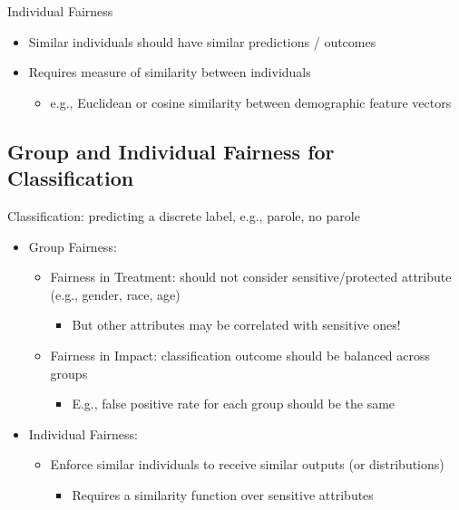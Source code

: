 \documentclass[11pt]{article}
\theoremstyle{definition}
\begin{document}
Individual Fairness
\begin{itemize}
    \item Similar individuals should have similar predictions / outcomes
    \item Requires measure of similarity between individuals
    \begin{itemize}
        \item e.g., Euclidean or cosine similarity between demographic feature vectors
    \end{itemize}
\end{itemize}

\subsection{Group and Individual Fairness for Classification}
Classification: predicting a discrete label, e.g., {parole, no parole}

\begin{itemize}
    \item Group Fairness:
    \begin{itemize}
        \item Fairness in Treatment: should not consider sensitive/protected attribute (e.g., gender, race, age)
        \begin{itemize}
            \item But other attributes may be correlated with sensitive ones!
        \end{itemize}
        \item Fairness in Impact: classification outcome should be balanced across groups
        \begin{itemize}
            \item E.g., false positive rate for each group should be the same
        \end{itemize}
    \end{itemize}
    \item Individual Fairness:
    \begin{itemize}
        \item Enforce similar individuals to receive similar outputs (or distributions)
        \begin{itemize}
            \item Requires a similarity function over sensitive attributes
        \end{itemize}
    \end{itemize}
\end{itemize}
\end{document}
